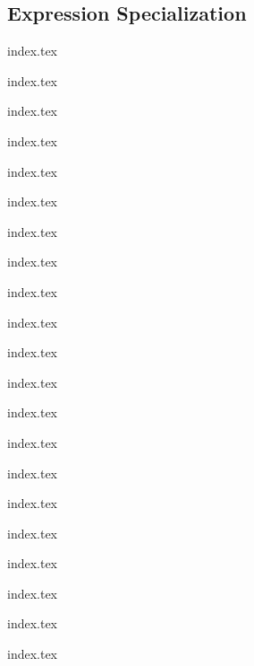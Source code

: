 
\subsection{Expression Specialization}
{
	\lipsum[1]
	
	{index.tex}
	
	{index.tex}
	
	{index.tex}
	
	{index.tex}
	
	{index.tex}
	
	{index.tex}
	
	{index.tex}
	
	{index.tex}
	
	{index.tex}
	
	{index.tex}
	
	{index.tex}
	
	{index.tex}
	
	{index.tex}
	
	{index.tex}
	
	{index.tex}
	
	{index.tex}
	
	{index.tex}
	
	{index.tex}
	
	{index.tex}
	
	{index.tex}
	
	{index.tex}
}














